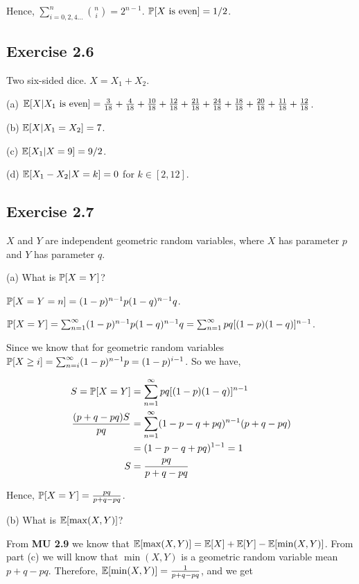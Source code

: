 Hence, $\sum_{i=0,2,4...}^{n} \binom{n}{i} = 2^{n-1}$. $\P[X \text{ is even}] = 1/2$.

\subsection*{Exercise 2.6}

Two six-sided dice. $X = X_1 + X_2$.

(a) $\E[X | X_1 \text{ is even}] = \frac{3}{18} + \frac{4}{18} + \frac{10}{18} + \frac{12}{18} + \frac{21}{18} + \frac{24}{18}
+ \frac{18}{18} + \frac{20}{18} + \frac{11}{18} + \frac{12}{18}$.

(b) $\E[X | X_1 = X_2] = 7$.

(c) $\E[X_1 | X = 9] = 9/2$.

(d) $\E[X_1 - X_2 | X = k] = 0 $ for $k \in [2,12]$.


\subsection*{Exercise 2.7}

$X$ and $Y$ are independent geometric random variables, where $X$ has parameter $p$ and $Y$ has parameter $q$.

(a) What is $\P[X = Y]$?

$\P[X = Y = n] = (1-p)^{n-1}p(1-q)^{n-1}q$. 

$\P[X=Y] = \sum_{n=1}^{\infty} (1-p)^{n-1}p(1-q)^{n-1}q
= \sum_{n=1}^{\infty} pq[(1-p)(1-q)]^{n-1}$.

Since we know that for geometric random variables 
$\P[X \geq i] = \sum_{n=i}^{\infty}(1-p)^{n-1}p = (1-p)^{i-1}$. So we have,

\begin{equation*}
\begin{split}
S = \P[X = Y] & = \sum_{n=1}^{\infty} pq[(1-p)(1-q)]^{n-1} \\
\frac{(p+q-pq)S}{pq} & = \sum_{n=1}^{\infty}(1-p-q+pq)^{n-1}(p+q-pq)\\
& = (1-p-q+pq)^{1-1} = 1\\
S & = \frac{pq}{p+q-pq}
\end{split}
\end{equation*}

Hence, $\P[X = Y] = \frac{pq}{p+q-pq}$.

(b) What is $\E[\max(X,Y)]$?

From \textbf{MU 2.9} we know that $\E[\max (X,Y)] = \E[X] + \E[Y] - \E[\min(X,Y)]$.
From part (c) we will know that $\min(X,Y)$ is a geometric random variable mean $p+q-pq$. 
Therefore, $\E[\min(X,Y)] = \frac{1}{p+q-pq}$, and we get

